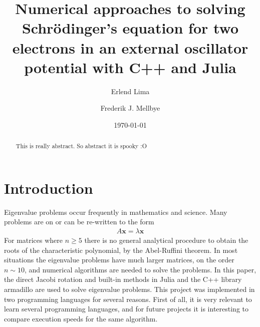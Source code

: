 \documentclass[aps,reprint]{revtex4-1}
\begin{document}
\title{Numerical approaches to solving Schrödinger's equation for
two electrons in an external oscillator potential with C++ and Julia}
\author{Erlend Lima}
\author{Frederik J. Mellbye}
\date{\today}

\begin{abstract}
  This is really abstract. So abstract it is spooky :O
\end{abstract}
\maketitle
\tableofcontents
\makeatletter
\let\toc@pre\relax
\let\toc@post\relax
\makeatother

\newpage

%
%
\section{Introduction}
\label{sec:introduction}
Eigenvalue problems occur frequently in mathematics and science. Many problems
are on or can be re-written to the form
\begin{align*}
  A \mathbf{x} = \lambda \mathbf{x}
\end{align*}
For matrices where $n \geq 5$ there is
no general analytical procedure to obtain the roots of the characteristic polynomial, by the
Abel-Ruffini theorem. In most situations the eigenvalue problems have much
larger matrices, on the order \(n\sim 10\), and numerical algorithms are needed to solve the problems. In
this paper, the direct Jacobi rotation and built-in methods in Julia and the C++
library armadillo are used to solve eigenvalue problems. This project was implemented
in two programming languages for several reasons. First of all, it is very relevant to
learn several programming languages, and for future projects it is interesting
to compare execution speeds for the same algorithm.
\end{document}
